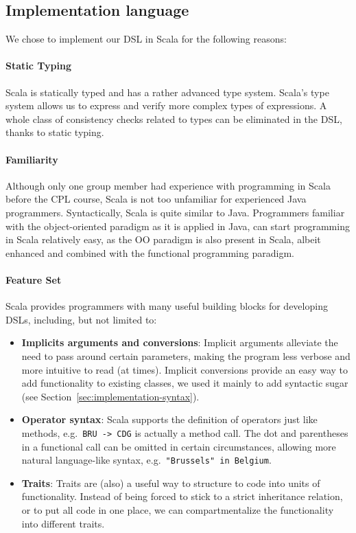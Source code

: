 \documentclass[a4paper]{article}
\renewcommand{\sc}[1]{\lstinline{#1}}
\begin{document}
\subsection{Implementation language}
\label{sec:implementation-language}

We chose to implement our DSL in Scala for the following reasons:

\paragraph{Static Typing}
Scala is statically typed and has a rather advanced type system.
Scala's type system allows us to express and verify more complex types of expressions.
A whole class of consistency checks related to types can be eliminated in the DSL, thanks to static typing.

\paragraph{Familiarity}
Although only one group member had experience with programming in Scala before the \textsc{CPL} course, Scala is not too unfamiliar for experienced Java programmers.
Syntactically, Scala is quite similar to Java.
Programmers familiar with the object-oriented paradigm as it is applied in Java, can start programming in Scala relatively easy, as the \textsc{OO} paradigm is also present in Scala, albeit enhanced and combined with the functional programming paradigm.

\paragraph{Feature Set}
Scala provides programmers with many useful building blocks for developing DSLs, including, but not limited to:

\begin{itemize}
\item \textbf{Implicits arguments and conversions}:
  Implicit arguments alleviate the need to pass around certain parameters, making the program less verbose and more intuitive to read (at times).
  Implicit conversions provide an easy way to add functionality to existing classes, we used it mainly to add syntactic sugar (see Section~\ref{sec:implementation-syntax}).
\item \textbf{Operator syntax}:
  Scala supports the definition of operators just like methods, e.g.\ \sc{BRU -> CDG} is actually a method call.
  The dot and parentheses in a functional call can be omitted in certain circumstances, allowing more natural language-like syntax, e.g.\ \sc{"Brussels" in Belgium}.
\item \textbf{Traits}:
  Traits are (also) a useful way to structure to code into units of functionality.
  Instead of being forced to stick to a strict inheritance relation, or to put all code in one place, we can compartmentalize the functionality into different traits.
\end{itemize}
\end{document}
